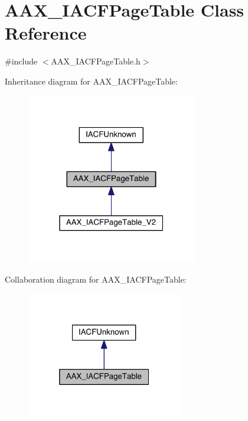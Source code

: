 \hypertarget{a00074}{}\section{A\+A\+X\+\_\+\+I\+A\+C\+F\+Page\+Table Class Reference}
\label{a00074}


{\ttfamily \#include $<$A\+A\+X\+\_\+\+I\+A\+C\+F\+Page\+Table.\+h$>$}



Inheritance diagram for A\+A\+X\+\_\+\+I\+A\+C\+F\+Page\+Table\+:
\nopagebreak
\begin{figure}[H]
\begin{center}
\leavevmode
\includegraphics[width=211pt]{a00565}
\end{center}
\end{figure}


Collaboration diagram for A\+A\+X\+\_\+\+I\+A\+C\+F\+Page\+Table\+:
\nopagebreak
\begin{figure}[H]
\begin{center}
\leavevmode
\includegraphics[width=193pt]{a00566}
\end{center}
\end{figure}


